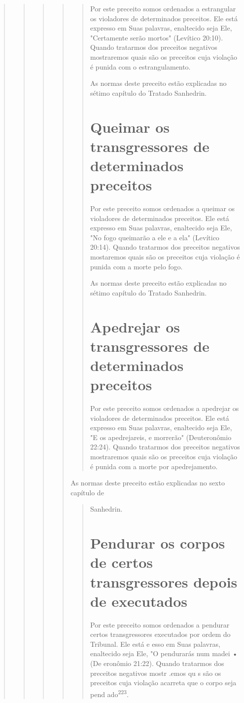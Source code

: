 \begin{quote}
\begin{quote}
\begin{quote}
\begin{quote}
\begin{quote}
Por este preceito somos ordenados a estrangular os violadores de
determinados preceitos. Ele está expresso em Suas palavras, enaltecido
seja Ele, "Certamente serão mortos" (Levítico 20:10). Quando tratarmos
dos preceitos negativos mostraremos quais são os preceitos cuja violação
é punida com o estrangulamento.

As normas deste preceito estão explicadas no sétimo capítulo do Tra­tado
Sanhedrin.

\section{Queimar os transgressores de determinados preceitos}

Por este preceito somos ordenados a queimar os violadores de
de­terminados preceitos. Ele está expresso em Suas palavras, enaltecido
seja Ele, "No fogo queimarão a ele e a ela" (Levítico 20:14). Quando
tratarmos dos pre­ceitos negativos mostaremos quais são os preceitos
cuja violação é punida com a morte pelo fogo.

As normas deste preceito estão explicadas no sétimo capítulo do Tra­tado
Sanhedrin.

\section{Apedrejar os transgressores de determinados preceitos}

Por este preceito somos ordenados a apedrejar os violadores de
de­terminados preceitos. Ele está expresso em Suas palavras, enaltecido
seja Ele, "E os apedrejareis, e morrerão" (Deuteronômio 22:24). Quando
tratarmos dos preceitos negativos mostraremos quais são os preceitos
cuja violação é punida com a morte por apedrejamento.
\end{quote}

As normas deste preceito estão explicadas no sexto capítulo de

\begin{quote}
Sanhedrin.



\section{Pendurar os corpos de certos transgressores depois de executados}

Por este preceito somos ordenados a pendurar certos transgressores
executados por ordem do Tribunal. Ele está e esso em Suas palavras,
enalte­cido seja Ele, "O pendurarás num madei • (De eronômio 21:22).
Quando tratarmos dos preceitos negativos mostr .emos
qu s são os preceitos cuja vio­lação acarreta que o corpo seja pend
ado\textsuperscript{223}.
\end{quote}


\end{quote}
\end{quote}
\end{quote}
\end{quote}
